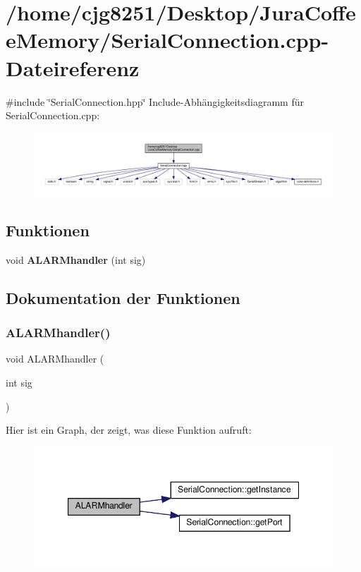 \section{/home/cjg8251/\+Desktop/\+Jura\+Coffee\+Memory/\+Serial\+Connection.cpp-\/\+Dateireferenz}
\label{_serial_connection_8cpp}
{\ttfamily \#include \char`\"{}Serial\+Connection.\+hpp\char`\"{}}\newline
Include-\/\+Abhängigkeitsdiagramm für Serial\+Connection.\+cpp\+:
\nopagebreak
\begin{figure}[H]
\begin{center}
\leavevmode
\includegraphics[width=350pt]{_serial_connection_8cpp__incl}
\end{center}
\end{figure}
\subsection*{Funktionen}
\begin{DoxyCompactItemize}
\item 
void \textbf{ A\+L\+A\+R\+Mhandler} (int sig)
\end{DoxyCompactItemize}


\subsection{Dokumentation der Funktionen}
\mbox{\label{_serial_connection_8cpp_a1e8896b6fa0aa733d2fdb7a3a3891a3b}} 
\subsubsection{A\+L\+A\+R\+Mhandler()}
{\footnotesize\ttfamily void A\+L\+A\+R\+Mhandler (\begin{DoxyParamCaption}\item[{int}]{sig }\end{DoxyParamCaption})}

Hier ist ein Graph, der zeigt, was diese Funktion aufruft\+:\nopagebreak
\begin{figure}[H]
\begin{center}
\leavevmode
\includegraphics[width=347pt]{_serial_connection_8cpp_a1e8896b6fa0aa733d2fdb7a3a3891a3b_cgraph}
\end{center}
\end{figure}
